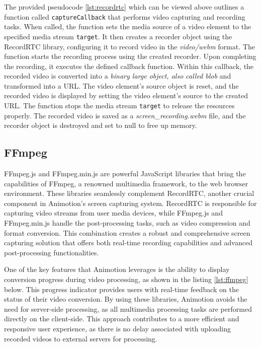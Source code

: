 The provided pseudocode \ref{lst:recordrtc} which can be viewed above outlines a function called \texttt{captureCallback}
that performs video capturing and recording tasks. When called, the function sets the media source of a video 
element to the specified media stream \texttt{target}. It then creates a recorder object using the RecordRTC library, 
configuring it to record video in the \emph{video/webm} format.
The function starts the recording process using the created recorder. Upon completing the recording, 
it executes the defined callback function. Within this callback, the recorded video is converted into a 
\emph{binary large object, also called blob} and transformed into a URL. The video element's source object is reset, and 
the recorded video is displayed by setting the video element's source to the created URL.
The function stops the media stream \texttt{target} to release the resources properly. 
The recorded video is saved as a \emph{screen\_recording.webm} file, and the recorder object is destroyed and set to null to free up memory.

\subsection{FFmpeg}
FFmpeg.js and FFmpeg.min.js are powerful JavaScript libraries that bring the capabilities 
of FFmpeg, a renowned multimedia framework, to the web browser environment. These libraries seamlessly complement 
RecordRTC, another crucial component in Animotion's screen capturing system. RecordRTC is responsible for 
capturing video streams from user media devices, while FFmpeg.js and FFmpeg.min.js handle the post-processing tasks, 
such as video compression and format conversion. This combination creates a robust and comprehensive screen capturing 
solution that offers both real-time recording capabilities and advanced post-processing functionalities.

One of the key features that Animotion leverages is the ability to display conversion progress during video processing, 
as shown in the listing \ref{lst:ffmpeg} below. This progress indicator provides users with real-time feedback on the status of their video conversion.
By using these libraries, Animotion avoids the need for server-side processing, as all multimedia 
processing tasks are performed directly on the client-side. This approach contributes to a more efficient and 
responsive user experience, as there is no delay associated with uploading recorded videos to external servers for processing. \cite{ffmpeg}

